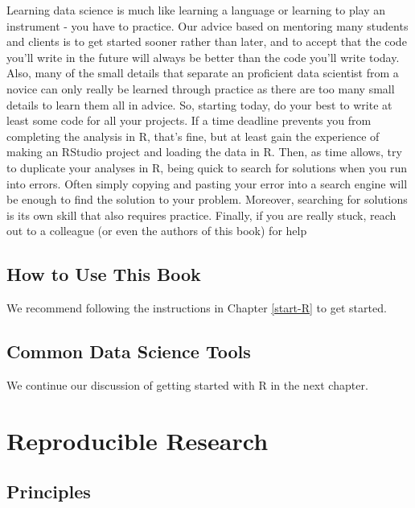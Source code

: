 \documentclass[
]{book}
\begin{document}
Learning data science is much like learning a language or learning to play an instrument - you have to practice. Our advice based on mentoring many students and clients is to get started sooner rather than later, and to accept that the code you'll write in the future will always be better than the code you'll write today. Also, many of the small details that separate an proficient data scientist from a novice can only really be learned through practice as there are too many small details to learn them all in advice. So, starting today, do your best to write at least some code for all your projects. If a time deadline prevents you from completing the analysis in R, that's fine, but at least gain the experience of making an RStudio project and loading the data in R. Then, as time allows, try to duplicate your analyses in R, being quick to search for solutions when you run into errors. Often simply copying and pasting your error into a search engine will be enough to find the solution to your problem. Moreover, searching for solutions is its own skill that also requires practice. Finally, if you are really stuck, reach out to a colleague (or even the authors of this book) for help

\hypertarget{how-to-use-this-book}{%
\section{How to Use This Book}\label{how-to-use-this-book}}

We recommend following the instructions in Chapter \ref{start-R} to get started.

\hypertarget{common-data-science-tools}{%
\section{Common Data Science Tools}\label{common-data-science-tools}}

We continue our discussion of getting started with R in the next chapter.

\hypertarget{reproducible-research}{%
\chapter{Reproducible Research}\label{reproducible-research}}

\hypertarget{principles}{%
\section{Principles}\label{principles}}
\end{document}

